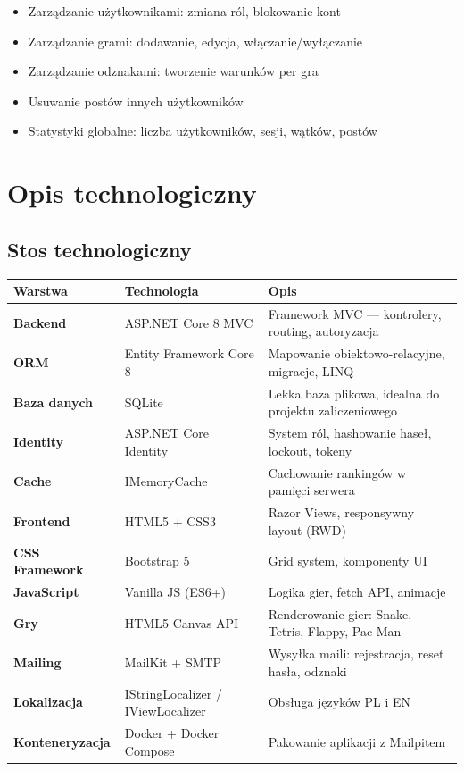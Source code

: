 \documentclass[12pt,a4paper]{article}
\begin{document}
\begin{itemize}[leftmargin=1.5cm]
  \item Zarządzanie użytkownikami: zmiana ról, blokowanie kont
  \item Zarządzanie grami: dodawanie, edycja, włączanie/wyłączanie
  \item Zarządzanie odznakami: tworzenie warunków per gra
  \item Usuwanie postów innych użytkowników
  \item Statystyki globalne: liczba użytkowników, sesji, wątków, postów
\end{itemize}

\section{Opis technologiczny}

\subsection{Stos technologiczny}

\begin{longtable}{>{\bfseries}p{3cm} p{4cm} p{7cm}}
  \toprule
  Warstwa & Technologia & Opis \\
  \midrule
  \endhead
  Backend      & ASP.NET Core 8 MVC         & Framework MVC --- kontrolery, routing, autoryzacja \\[4pt]
  ORM          & Entity Framework Core 8     & Mapowanie obiektowo-relacyjne, migracje, LINQ \\[4pt]
  Baza danych  & SQLite                      & Lekka baza plikowa, idealna do projektu zaliczeniowego \\[4pt]
  Identity     & ASP.NET Core Identity       & System ról, hashowanie haseł, lockout, tokeny \\[4pt]
  Cache        & IMemoryCache                & Cachowanie rankingów w pamięci serwera \\[4pt]
  Frontend     & HTML5 + CSS3               & Razor Views, responsywny layout (RWD) \\[4pt]
  CSS Framework& Bootstrap 5                 & Grid system, komponenty UI \\[4pt]
  JavaScript   & Vanilla JS (ES6+)           & Logika gier, fetch API, animacje \\[4pt]
  Gry          & HTML5 Canvas API            & Renderowanie gier: Snake, Tetris, Flappy, Pac-Man \\[4pt]
  Mailing      & MailKit + SMTP              & Wysyłka maili: rejestracja, reset hasła, odznaki \\[4pt]
  Lokalizacja  & IStringLocalizer / IViewLocalizer & Obsługa języków PL i EN \\[4pt]
  Konteneryzacja & Docker + Docker Compose   & Pakowanie aplikacji z Mailpitem \\
  \bottomrule
\end{longtable}
\end{document}
